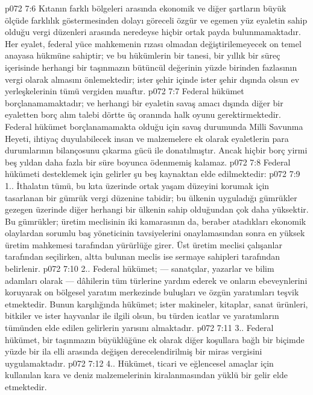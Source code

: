 \vs p072 7:6 Kıtanın farklı bölgeleri arasında ekonomik ve diğer şartların büyük ölçüde farklılık göstermesinden dolayı göreceli özgür ve egemen yüz eyaletin sahip olduğu vergi düzenleri arasında neredeyse hiçbir ortak payda bulunmamaktadır. Her eyalet, federal yüce mahkemenin rızası olmadan değiştirilemeyecek on temel anayasa hükmüne sahiptir; ve bu hükümlerin bir tanesi, bir yıllık bir süreç içerisinde herhangi bir taşınmazın bütüncül değerinin yüzde birinden fazlasının vergi olarak almasını önlemektedir; ister şehir içinde ister şehir dışında olsun ev yerleşkelerinin tümü vergiden muaftır.
\vs p072 7:7 Federal hükümet borçlanamamaktadır; ve herhangi bir eyaletin savaş amacı dışında diğer bir eyaletten borç alım talebi dörtte üç oranında halk oyunu gerektirmektedir. Federal hükümet borçlanamamakta olduğu için savaş durumunda Milli Savunma Heyeti, ihtiyaç duyulabilecek insan ve malzemelere ek olarak eyaletlerin para durumlarının bilançosunu çıkarma gücü ile donatılmıştır. Ancak hiçbir borç yirmi beş yıldan daha fazla bir süre boyunca ödenmemiş kalamaz.
\vs p072 7:8 Federal hükümeti desteklemek için gelirler şu beş kaynaktan elde edilmektedir:
\vs p072 7:9 1.\bibnobreakspace {}. İthalatın tümü, bu kıta üzerinde ortak yaşam düzeyini korumak için tasarlanan bir gümrük vergi düzenine tabidir; bu ülkenin uyguladığı gümrükler gezegen üzerinde diğer herhangi bir ülkenin sahip olduğundan çok daha yüksektir. Bu gümrükler; üretim meclisinin iki kamarasının da, beraber atadıkları ekonomik olaylardan sorumlu baş yöneticinin tavsiyelerini onaylamasından sonra en yüksek üretim mahkemesi tarafından yürürlüğe girer. Üst üretim meclisi çalışanlar tarafından seçilirken, altta bulunan meclis ise sermaye sahipleri tarafından belirlenir.
\vs p072 7:10 2.\bibnobreakspace {}. Federal hükümet; --- sanatçılar, yazarlar ve bilim adamları olarak --- dâhilerin tüm türlerine yardım ederek ve onların ebeveynlerini koruyarak on bölgesel yaratım merkezinde buluşları ve özgün yaratımları teşvik etmektedir. Bunun karşılığında hükümet; ister makineler, kitaplar, sanat ürünleri, bitkiler ve ister hayvanlar ile ilgili olsun, bu türden icatlar ve yaratımların tümünden elde edilen gelirlerin yarısını almaktadır.
\vs p072 7:11 3.\bibnobreakspace {}. Federal hükümet, bir taşınmazın büyüklüğüne ek olarak diğer koşullara bağlı bir biçimde yüzde bir ila elli arasında değişen derecelendirilmiş bir miras vergisini uygulamaktadır.
\vs p072 7:12 4.\bibnobreakspace {}. Hükümet, ticari ve eğlencesel amaçlar için kullanılan kara ve deniz malzemelerinin kiralanmasından yüklü bir gelir elde etmektedir.
